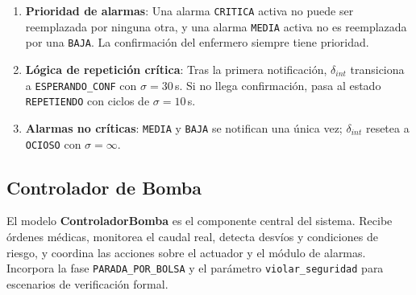 \documentclass[12pt,a4paper]{article}
\begin{document}
\begin{enumerate}
    \item \textbf{Prioridad de alarmas}: Una alarma \texttt{CRITICA}
    activa no puede ser reemplazada por ninguna otra, y una alarma
    \texttt{MEDIA} activa no es reemplazada por una \texttt{BAJA}.
    La confirmación del enfermero siempre tiene prioridad.

    \item \textbf{Lógica de repetición crítica}: Tras la primera
    notificación, $\delta_{\mathit{int}}$ transiciona a
    \texttt{ESPERANDO\_CONF} con $\sigma = 30$\,s.  Si no llega
    confirmación, pasa al estado \texttt{REPETIENDO} con ciclos de
    $\sigma = 10$\,s.

    \item \textbf{Alarmas no críticas}: \texttt{MEDIA} y
    \texttt{BAJA} se notifican una única vez;
    $\delta_{\mathit{int}}$ resetea a \texttt{OCIOSO} con
    $\sigma = \infty$.
\end{enumerate}

\subsection{Controlador de Bomba}

El modelo \textbf{ControladorBomba} es el componente central del
sistema.  Recibe órdenes médicas, monitorea el caudal real, detecta
desvíos y condiciones de riesgo, y coordina las acciones sobre el
actuador y el módulo de alarmas.  Incorpora la fase
\texttt{PARADA\_POR\_BOLSA} y el parámetro \texttt{violar\_seguridad}
para escenarios de verificación formal.
\end{document}
